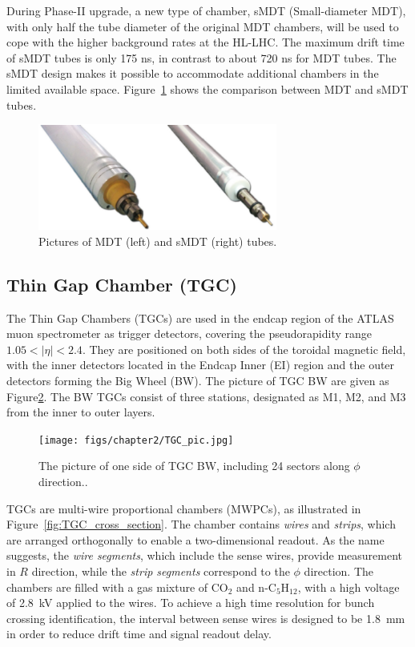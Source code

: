 During Phase-II upgrade, a new type of chamber, sMDT (Small-diameter MDT), with only half the tube diameter of the original MDT chambers, will be used to cope with the higher background rates at the HL-LHC. The maximum drift time of sMDT tubes is only 175 ns, in contrast to about 720 ns for MDT tubes. The sMDT design makes it possible to accommodate additional chambers in the limited available space. Figure~\ref{fig:sMDT} shows the comparison between MDT and sMDT tubes.

\begin{figure}[htbp]
  \centering
  \includegraphics[width=0.7\textwidth]{figs/chapter2/sMDT_MDT.png}
  \caption{Pictures of MDT (left) and sMDT (right) tubes.}
  \label{fig:sMDT}
\end{figure}

\subsection{Thin Gap Chamber (TGC)} \label{sec:TGC}
The Thin Gap Chambers (TGCs) are used in the endcap region of the ATLAS muon spectrometer as trigger detectors, covering the pseudorapidity range $1.05 < |\eta| < 2.4$. They are positioned on both sides of the toroidal magnetic field, with the inner detectors located in the Endcap Inner (EI) region and the outer detectors forming the Big Wheel (BW). The picture of TGC BW are given as Figure\ref{fig:TGC_pic}. The BW TGCs consist of three stations, designated as M1, M2, and M3 from the inner to outer layers.

\begin{figure}[htbp]
  \centering
  \texttt{[image: figs/chapter2/TGC\_pic.jpg]}
  \caption{The picture of one side of TGC BW, including 24 sectors along $\phi$ direction.\cite{TGCInstallation}.}
  \label{fig:TGC_pic}
\end{figure}

TGCs are multi-wire proportional chambers (MWPCs), as illustrated in Figure~\ref{fig:TGC_cross_section}. The chamber contains \textit{wires} and \textit{strips}, which are arranged orthogonally to enable a two-dimensional readout. As the name suggests, the \textit{wire segments}, which include the sense wires, provide measurement in $R$ direction, while the \textit{strip segments} correspond to the $\phi$ direction. The chambers are filled with a gas mixture of CO$_2$ and n-C$_5$H$_{12}$, with a high voltage of 2.8~kV applied to the wires. To achieve a high time resolution for bunch crossing identification, the interval between sense wires is designed to be 1.8~mm in order to reduce drift time and signal readout delay.

